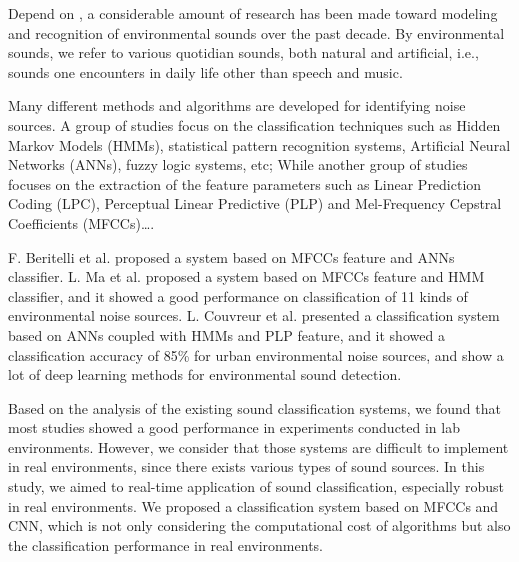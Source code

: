 Depend on \cite{survey}, a considerable amount of research has been made toward modeling and recognition of environmental sounds over the past decade. By environmental sounds, we refer to various quotidian sounds, both natural and artificial, i.e., sounds
one encounters in daily life other than speech and music.

Many different methods and algorithms are developed for
identifying noise sources. A group of studies focus on the classification techniques such as Hidden Markov Models (HMMs), statistical pattern recognition systems, Artificial Neural Networks (ANNs), fuzzy logic systems, etc; While another group of studies focuses on the extraction of the feature parameters such as Linear Prediction Coding (LPC), Perceptual Linear Predictive (PLP) and Mel-Frequency Cepstral Coefficients (MFCCs)\ldots. 

F. Beritelli et al.\cite{MFCC} proposed a system  based on MFCCs feature and ANNs classifier. L. Ma et al.\cite{Context-Aware} proposed a system based on MFCCs feature and HMM classifier, and it showed a good performance on classification of 11 kinds of environmental noise sources. L. Couvreur et al.\cite{urban} presented a classification system based on ANNs coupled with HMMs and PLP feature, and it showed a classification accuracy of 85\% for urban environmental noise sources, and \cite{DL} show a lot of deep learning methods for environmental sound detection.

Based on the analysis of the existing sound classification systems, we found that most studies showed a good performance in experiments conducted in lab environments.
However, we consider that those systems are difficult to implement in real environments, since there exists various types of sound sources. 
In this study, we aimed to real-time application of sound classification, especially robust in real environments. We proposed a classification system based on MFCCs and CNN, which is not only considering the computational cost of algorithms but also the classification performance in real environments.
